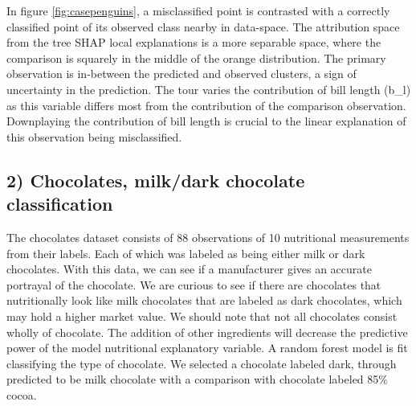 \documentclass[
  article]{article}
\begin{document}
In figure \ref{fig:casepenguins}, a misclassified point is contrasted with a correctly classified point of its observed class nearby in data-space. The attribution space from the tree SHAP local explanations is a more separable space, where the comparison is squarely in the middle of the orange distribution. The primary observation is in-between the predicted and observed clusters, a sign of uncertainty in the prediction. The tour varies the contribution of bill length (b\_l) as this variable differs most from the contribution of the comparison observation. Downplaying the contribution of bill length is crucial to the linear explanation of this observation being misclassified.

\hypertarget{chocolates-milkdark-chocolate-classification}{%
\subsection{2) Chocolates, milk/dark chocolate classification}\label{chocolates-milkdark-chocolate-classification}}

The chocolates dataset consists of 88 observations of 10 nutritional measurements from their labels. Each of which was labeled as being either milk or dark chocolates. With this data, we can see if a manufacturer gives an accurate portrayal of the chocolate. We are curious to see if there are chocolates that nutritionally look like milk chocolates that are labeled as dark chocolates, which may hold a higher market value. We should note that not all chocolates consist wholly of chocolate. The addition of other ingredients will decrease the predictive power of the model nutritional explanatory variable. A random forest model is fit classifying the type of chocolate. We selected a chocolate labeled dark, through predicted to be milk chocolate with a comparison with chocolate labeled 85\% cocoa.
\end{document}
